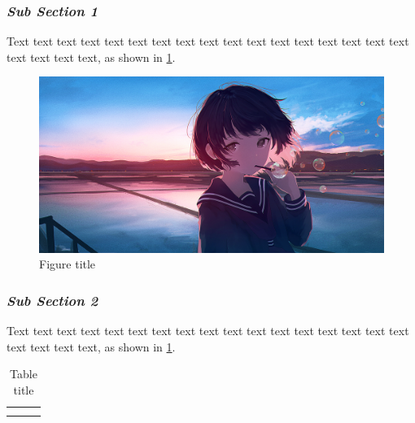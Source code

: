 \documentclass[12pt,a4paper]{article}
\numberwithin{equation}{section}
\begin{document}
{{\subsubsection{\textit{Sub Section 1}}
\hspace{2em}Text text text text text text text text text text text text text text text text text text text text text, as shown in \cref{fig:2- 1}.

\begin{figure}[h]
    \centering
    \includegraphics[width=1\textwidth, height=0.8\textwidth]{Fig example.png}
    \caption{Figure title}
    \label{fig:2- 1}
\end{figure}

\subsubsection{\textit{Sub Section 2}}
\hspace{2em}Text text text text text text text text text text text text text text text text text text text text text, as shown in \cref{tab:2-1}.

\renewcommand{\arraystretch}{4}
\begin{table}[htbp]
  \centering 
  \label{tab:2-1}
  \begin{tabular}{|p{5cm}|p{5cm}|p{5cm}|}
    \hline
     &  &  \\
    \hline
     &  &  \\
    \hline
     &  &  \\
    \hline
  \end{tabular}
  \caption{Table title}
\end{table}

}}
\end{document}
